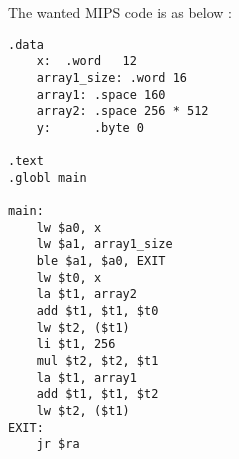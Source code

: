 
The wanted MIPS code is as below : 
\begin{lstlisting}[style=mystyle]
.data
    x:	.word	12
    array1_size: .word 16
    array1: .space 160
    array2: .space 256 * 512
    y:      .byte 0

.text
.globl main

main:
    lw $a0, x
    lw $a1, array1_size
    ble $a1, $a0, EXIT
    lw $t0, x
    la $t1, array2
    add $t1, $t1, $t0
    lw $t2, ($t1)
    li $t1, 256
    mul $t2, $t2, $t1
    la $t1, array1
    add $t1, $t1, $t2
    lw $t2, ($t1)
EXIT:
    jr $ra
\end{lstlisting}